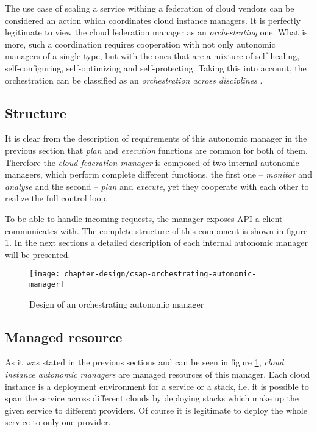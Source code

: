 The use case of scaling a service withing a federation of cloud vendors can be considered an action which coordinates cloud instance managers. It is perfectly legitimate to view the cloud federation manager as an \emph{orchestrating} one. What is more, such a coordination requires cooperation with not only autonomic managers of a single type, but with the ones that are a mixture of self-healing, self-configuring, self-optimizing and self-protecting. Taking this into account, the orchestration can be classified as an \emph{orchestration across disciplines} \cite{IBM06}.

\subsection{Structure}
It is clear from the description of requirements of this autonomic manager in the previous section that \emph{plan} and \emph{execution} functions are common for both of them. Therefore the \emph{cloud federation manager} is composed of two internal autonomic managers, which perform complete different functions, the first one -- \emph{monitor} and \emph{analyse} and the second -- \emph{plan} and \emph{execute}, yet they cooperate with each other to realize the full control loop.

To be able to handle incoming requests, the manager exposes API a client communicates with. The complete structure of this component is shown in figure \ref{img:orchestrating-autonomic-manager}. In the next sections a detailed description of each internal autonomic manager will be presented.

\begin{figure}[!ht]
  \begin{center}
    \texttt{[image: chapter-design/csap-orchestrating-autonomic-manager]}
  \end{center}
  \caption{Design of an orchestrating autonomic manager}
  \label{img:orchestrating-autonomic-manager}
\end{figure}

\subsection{Managed resource}
As it was stated in the previous sections and can be seen in figure \ref{img:orchestrating-autonomic-manager}, \emph{cloud instance autonomic managers} are managed resources of this manager. Each cloud instance is a deployment environment for a service or a stack, i.e. it is possible to span the service across different clouds by deploying stacks which make up the given service to different providers. Of course it is legitimate to deploy the whole service to only one provider.
